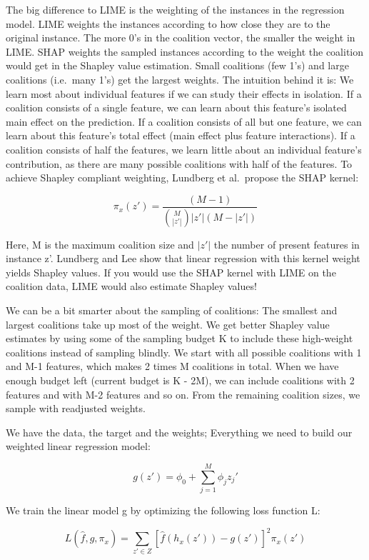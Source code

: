 \documentclass[
  11pt,
]{scrbook}
\begin{document}
The big difference to LIME is the weighting of the instances in the regression model.
LIME weights the instances according to how close they are to the original instance.
The more 0's in the coalition vector, the smaller the weight in LIME.
SHAP weights the sampled instances according to the weight the coalition would get in the Shapley value estimation.
Small coalitions (few 1's) and large coalitions (i.e.~many 1's) get the largest weights.
The intuition behind it is:
We learn most about individual features if we can study their effects in isolation.
If a coalition consists of a single feature, we can learn about this feature's isolated main effect on the prediction.
If a coalition consists of all but one feature, we can learn about this feature's total effect (main effect plus feature interactions).
If a coalition consists of half the features, we learn little about an individual feature's contribution, as there are many possible coalitions with half of the features.
To achieve Shapley compliant weighting, Lundberg et al.~propose the SHAP kernel:

\[\pi_{x}(z')=\frac{(M-1)}{\binom{M}{|z'|}|z'|(M-|z'|)}\]

Here, M is the maximum coalition size and \(|z'|\) the number of present features in instance z'.
Lundberg and Lee show that linear regression with this kernel weight yields Shapley values.
If you would use the SHAP kernel with LIME on the coalition data, LIME would also estimate Shapley values!

We can be a bit smarter about the sampling of coalitions:
The smallest and largest coalitions take up most of the weight.
We get better Shapley value estimates by using some of the sampling budget K to include these high-weight coalitions instead of sampling blindly.
We start with all possible coalitions with 1 and M-1 features, which makes 2 times M coalitions in total.
When we have enough budget left (current budget is K - 2M), we can include coalitions with 2 features and with M-2 features and so on.
From the remaining coalition sizes, we sample with readjusted weights.

We have the data, the target and the weights;
Everything we need to build our weighted linear regression model:

\[g(z')=\phi_0+\sum_{j=1}^M\phi_jz_j'\]

We train the linear model g by optimizing the following loss function L:

\[L(\hat{f},g,\pi_{x})=\sum_{z'\in{}Z}[\hat{f}(h_x(z'))-g(z')]^2\pi_{x}(z')\]
\end{document}

